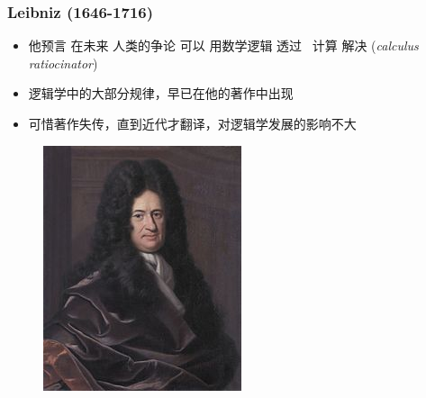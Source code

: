 \documentclass[15pt]{beamer}
\begin{document}
\begin{frame}
\frametitle{Leibniz (1646-1716)}
\begin{minipage}[t]{0.6\linewidth}
	\begin{itemize}
		\item 他预言 在未来 人类的争论 可以 用数学逻辑 透过 {\color{red}\ 计算} 解决 (\textit{calculus ratiocinator})
		\item 逻辑学中的大部分规律，早已在他的著作中出现
		\item 可惜著作失传，直到近代才翻译，对逻辑学发展的影响不大
	\end{itemize}
\end{minipage}
\hfill
\begin{minipage}[t]{0.35\linewidth}
	\begin{figure}[H]
		\includegraphics[scale=1.25]{Leibniz.jpg}
	\end{figure}
\end{minipage}
\end{frame}
\end{document}

